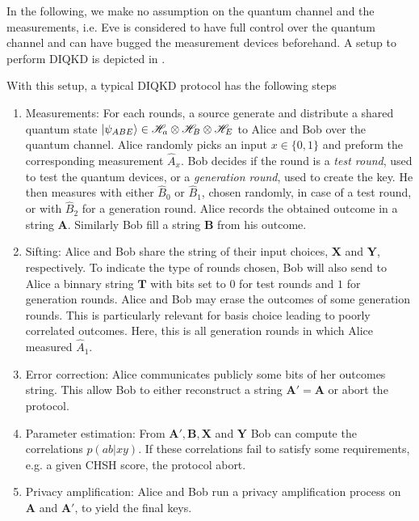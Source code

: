 In the following, we make no assumption on the quantum channel and the measurements, i.e. Eve is considered to have full control over the quantum channel and can have bugged the measurement devices beforehand.
A setup to perform DIQKD is depicted in .

\medbreak

With this setup, a typical DIQKD protocol has the following steps
\begin{enumerate}
	\item Measurements: For each rounds, a source generate and distribute a shared quantum state $\ket{\psi_{ABE}} \in \mathscr{H}_a \otimes \mathscr{H}_B \otimes \mathscr{H}_E$ to Alice and Bob over the quantum channel. Alice randomly picks an input $x\in\{0,1\}$ and preform the corresponding measurement $\hat{A}_x$. 
		Bob decides if the round is a \textit{test round}, used to test the quantum devices, or a \textit{generation round}, used to create the key.
		He then measures with either $\hat{B}_0$ or $\hat{B}_1$, chosen randomly, in case of a test round, or with $\hat{B}_2$ for a generation round. 
		Alice records the obtained outcome in a string $\mathbf{A}$. 
		Similarly Bob fill a string $\mathbf{B}$ from his outcome. 
	\item Sifting: 
		Alice and Bob share the string of their input choices, $\mathbf{X}$ and $\mathbf{Y}$, respectively.
		To indicate the type of rounds chosen, Bob will also send to Alice a binnary string $\mathbf{T}$ with bits set to $0$ for test rounds and $1$ for generation rounds.  
		Alice and Bob may erase the outcomes of some generation rounds. 
		This is particularly relevant for basis choice leading to poorly correlated outcomes. 
		Here, this is all generation rounds in which Alice measured $\hat{A}_1$. 	
	\item Error correction: 
		Alice communicates publicly some bits of her outcomes string. 
		This allow Bob to either reconstruct a string $\mathbf{A'}=\mathbf{A}$ or abort the protocol.
	\item Parameter estimation:
		From $\mathbf{A'},\mathbf{B},\mathbf{X}$ and $\mathbf{Y}$ Bob can compute the correlations $p(ab|xy)$. 
		If these correlations fail to satisfy some requirements, e.g. a given CHSH score, the protocol abort. 
	\item Privacy amplification: 
		Alice and Bob run a privacy amplification process on $\mathbf{A}$ and $\mathbf{A'}$, to yield the final keys.
\end{enumerate}

